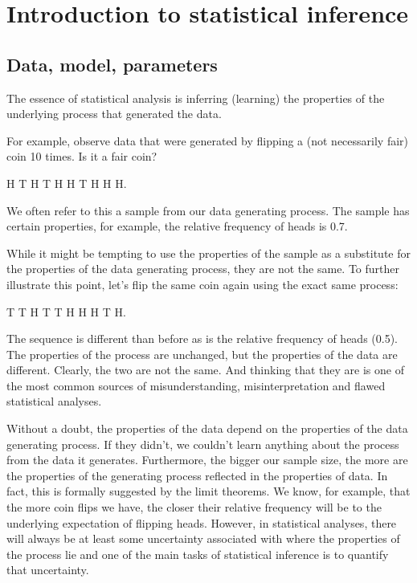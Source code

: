 \documentclass{book}
\theoremstyle{plain}%
\theoremstyle{definition}
\begin{document}
\chapter{Introduction to statistical inference}\label{ch:inference}

\section{Data, model, parameters}

The essence of statistical analysis is inferring (learning) the properties of the underlying process that generated the data.

For example, observe data that were generated by flipping a (not necessarily fair) coin 10 times. Is it a fair coin?

\begin{center}
H T H T H H T H H H.
\end{center}

We often refer to this a sample from our data generating process. The sample has certain properties, for example, the relative frequency of heads is 0.7.

While it might be tempting to use the properties of the sample as a substitute for the properties of the data generating process, they are not the same. To further illustrate this point, let's flip the same coin again using the exact same process:

\begin{center}
T T H T T H H H T H.
\end{center}

The sequence is different than before as is the relative frequency of heads (0.5). The properties of the process are unchanged, but the properties of the data are different. Clearly, the two are not the same. And thinking that they are is one of the most common sources of misunderstanding, misinterpretation and flawed statistical analyses.

Without a doubt, the properties of the data depend on the properties of the data generating process. If they didn't, we couldn't learn anything about the process from the data it generates. Furthermore, the bigger our sample size, the more are the properties of the generating process reflected in the properties of data. In fact, this is formally suggested by the limit theorems. We know, for example, that the more coin flips we have, the closer their relative frequency will be to the underlying expectation of flipping heads. However, in statistical analyses, there will always be at least some uncertainty associated with where the properties of the process lie and one of the main tasks of statistical inference is to quantify that uncertainty.
\end{document}
